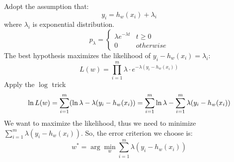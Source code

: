 \documentclass[a4paper, 12pt, titlepage]{article}
\begin{document}
\begin{enumerate}[(a)]
Adopt the assumption that:
$$y_i=h_w(x_i)+\lambda_i$$
where $\lambda_i$ is exponential distribution.
$$
    p_\lambda=\begin{cases}
        \lambda{}e^{-\lambda{}t}&t\geq0 \\
        0&otherwise
    \end{cases}
$$
The best hypothesis maximizes the likelihood of $y_i-h_w(x_i)=\lambda_i$:
$$L(w)=\prod_{i=1}^m\lambda\cdot{}e^{-\lambda(y_i-h_w(x_i))}$$
Apply the $\log$ trick
$$\ln{}L(w)=\sum^m_{i=1}(\ln\lambda-\lambda(y_i-h_w(x_i))\\
=\sum^m_{i=1}\ln\lambda-\sum^m_{i=1}\lambda(y_i-h_w(x_i))$$
We want to maximize the likelihood, thus we need to minimize $\sum^m_{i=1}\lambda(y_i-h_w(x_i))$. So, the error criterion we choose is:
$$w^*=\arg\min_w\sum^m_{i=1}\lambda(y_i-h_w(x_i))$$


\end{enumerate}
\end{document}
